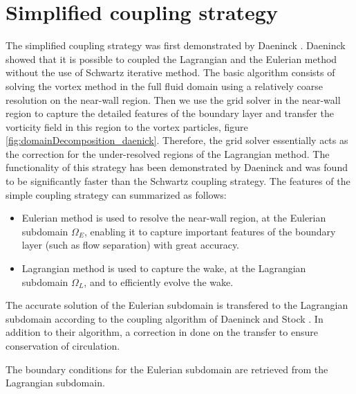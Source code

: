 	\section{Simplified coupling strategy}

	The simplified coupling strategy was first demonstrated by Daeninck \cite{Daeninck2006}. Daeninck showed that it is possible to coupled the Lagrangian and the Eulerian method without the use of Schwartz iterative method. The basic algorithm consists of solving the vortex method in the full fluid domain using a relatively coarse resolution on the near-wall region. Then we use the grid solver in the near-wall region to capture the detailed features of the boundary layer and transfer the vorticity field in this region to the vortex particles, figure \ref{fig:domainDecomposition_daenick}. Therefore, the grid solver essentially acts as the correction for the under-resolved regions of the Lagrangian method. The functionality of this strategy has been demonstrated by Daeninck and was found to be significantly faster than the Schwartz coupling strategy. The features of the simple coupling strategy can summarized as follows:

		\begin{itemize}
		\item Eulerian method is used to resolve the near-wall region, at the Eulerian subdomain $\Omega_E$, enabling it to capture important features of the boundary layer (such as flow separation) with great accuracy.
		
		\item Lagrangian method is used to capture the wake, at the Lagrangian subdomain $\Omega_L$, and to efficiently evolve the wake.
		
		\end{itemize}


		\item The accurate solution of the Eulerian subdomain is transfered to the Lagrangian subdomain according to the coupling algorithm of Daeninck \cite{Daeninck2006} and Stock \cite{Stock2010a}. In addition to their algorithm, a correction in done on the transfer to ensure conservation of circulation.
		
		\item The boundary conditions for the Eulerian subdomain are retrieved from the Lagrangian subdomain.

